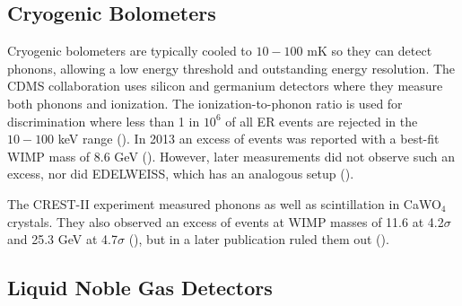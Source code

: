 \subsection{Cryogenic Bolometers} \label{subsec:bolometers}
Cryogenic bolometers are typically cooled to $10-100$ mK so they can detect phonons, allowing a low energy threshold and
outstanding energy resolution.  The CDMS collaboration uses silicon and germanium detectors where they measure both phonons
and ionization.  The ionization-to-phonon ratio is used for discrimination where less than 1 in $10^{6}$ of all ER events
are rejected in the $10-100$ keV range ().  In 2013 an excess of events was reported with a best-fit
WIMP mass of 8.6 GeV ().  However, later measurements did not observe such an excess, nor did EDELWEISS,
which has an analogous setup ().

The CREST-II experiment measured phonons as well as scintillation in CaWO$_{4}$ crystals.  They also observed an excess of
events at WIMP masses of 11.6 at 4.2$\sigma$ and 25.3 GeV at 4.7$\sigma$ (), but in a later publication
ruled them out ().


\subsection{Liquid Noble Gas Detectors} \label{subsec:noble_gas}



